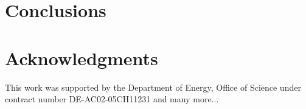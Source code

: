 \documentclass[12pt,prd]{article}
\begin{document}
\section{Conclusions} \label{sec:conclusions}


\section*{\label{sec::acknowledgments}Acknowledgments}

This work was supported by the Department of Energy, Office of Science under contract number DE-AC02-05CH11231 and many more...



\end{document}
